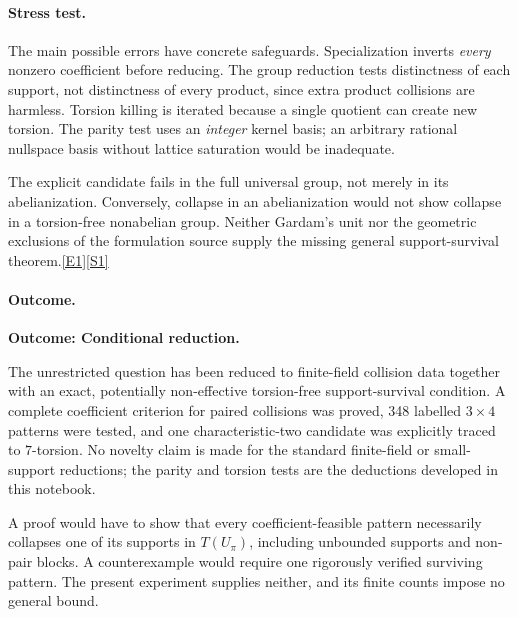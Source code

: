 \documentclass[11pt,a4paper]{article}
\newcommand{\sref}[2]{\hyperlink{source:#1:#2}{[S#2]}}
\newcommand{\eref}[2]{\hyperlink{extra:#1:#2}{[E#2]}}
\begin{document}
\paragraph{Stress test.}
The main possible errors have concrete safeguards. Specialization
inverts \emph{every} nonzero coefficient before reducing. The group
reduction tests distinctness of each support, not distinctness of every
product, since extra product collisions are harmless. Torsion killing
is iterated because a single quotient can create new torsion. The parity
test uses an \emph{integer} kernel basis; an arbitrary rational nullspace
basis without lattice saturation would be inadequate.

The explicit candidate fails in the full universal group, not merely in
its abelianization. Conversely, collapse in an abelianization would not
show collapse in a torsion-free nonabelian group. Neither Gardam's unit
nor the geometric exclusions of the formulation source supply the
missing general support-survival theorem.\eref{statement}{1}\sref{statement}{1}

\paragraph{Outcome.}
\textbf{Outcome: Conditional reduction.}

The unrestricted question has been reduced to finite-field collision
data together with an exact, potentially non-effective torsion-free
support-survival condition. A complete coefficient criterion for paired
collisions was proved, 348 labelled $3\times4$ patterns were tested, and
one characteristic-two candidate was explicitly traced to $7$-torsion.
No novelty claim is made for the standard finite-field or small-support
reductions; the parity and torsion tests are the deductions developed
in this notebook.

A proof would have to show that every coefficient-feasible pattern
necessarily collapses one of its supports in $T(U_\pi)$, including
unbounded supports and non-pair blocks. A counterexample would require
one rigorously verified surviving pattern. The present experiment
supplies neither, and its finite counts impose no general bound.

\end{document}
